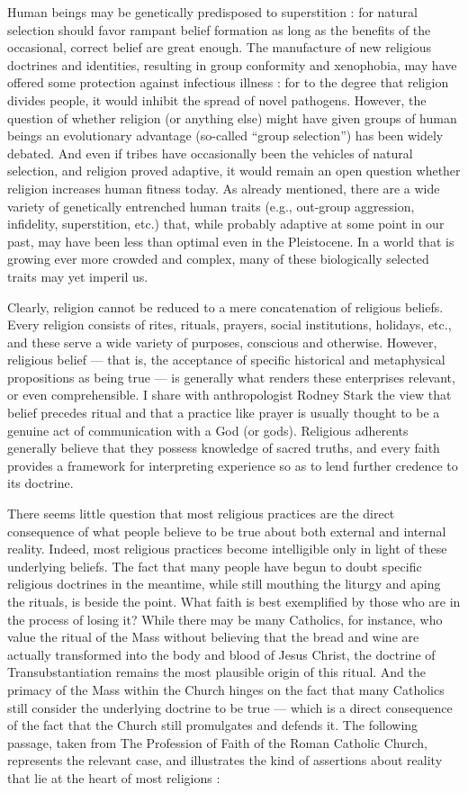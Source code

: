 \documentclass[a4paper,14pt]{extarticle}
\begin{document}
Human beings may be genetically predisposed to superstition :
for natural selection should favor rampant belief formation as long as the benefits of the occasional, correct belief are great enough.
The manufacture of new religious doctrines and identities, resulting in group conformity and xenophobia, may have offered some protection against infectious illness :
for to the degree that religion divides people, it would inhibit the spread of novel pathogens.
However, the question of whether religion (or anything else) might have given groups of human beings an evolutionary advantage (so-called ``group selection'') has been widely debated.
And even if tribes have occasionally been the vehicles of natural selection, and religion proved adaptive, it would remain an open question whether religion increases human fitness today.
As already mentioned, there are a wide variety of genetically entrenched human traits (e.g., out-group aggression, infidelity, superstition, etc.) that, while probably adaptive at some point in our past, may have been less than optimal even in the Pleistocene.
In a world that is growing ever more crowded and complex, many of these biologically selected traits may yet imperil us.

Clearly, religion cannot be reduced to a mere concatenation of religious beliefs.
Every religion consists of rites, rituals, prayers, social institutions, holidays, etc., and these serve a wide variety of purposes, conscious and otherwise.
However, religious belief --- that is, the acceptance of specific historical and metaphysical propositions as being true --- is generally what renders these enterprises relevant, or even comprehensible.
I share with anthropologist Rodney Stark the view that belief precedes ritual and that a practice like prayer is usually thought to be a genuine act of communication with a God (or gods).
Religious adherents generally believe that they possess knowledge of sacred truths, and every faith provides a framework for interpreting experience so as to lend further credence to its doctrine.

There seems little question that most religious practices are the direct consequence of what people believe to be true about both external and internal reality.
Indeed, most religious practices become intelligible only in light of these underlying beliefs.
The fact that many people have begun to doubt specific religious doctrines in the meantime, while still mouthing the liturgy and aping the rituals, is beside the point.
What faith is best exemplified by those who are in the process of losing it?
While there may be many Catholics, for instance, who value the ritual of the Mass without believing that the bread and wine are actually transformed into the body and blood of Jesus Christ, the doctrine of Transubstantiation remains the most plausible origin of this ritual.
And the primacy of the Mass within the Church hinges on the fact that many Catholics still consider the underlying doctrine to be true --- which is a direct consequence of the fact that the Church still promulgates and defends it.
The following passage, taken from The Profession of Faith of the Roman Catholic Church, represents the relevant case, and illustrates the kind of assertions about reality that lie at the heart of most religions :
\end{document}
